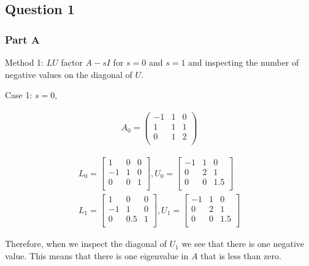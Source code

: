 \subsection{Question 1}
\subsubsection{Part A}

Method 1: \(LU\) factor \(A-sI\) for \(s=0\) and \(s=1\) and inspecting the number of negative values on the diagonal of \(U\).

Case 1: \(s=0\),

\begin{eqnarray}
  A_0 = 
  \begin{pmatrix}
    -1 & 1 & 0 \\
    1 & 1 & 1 \\
    0 & 1 & 2 \\
  \end{pmatrix}
\end{eqnarray}

\begin{eqnarray}
  L_0 =
  \begin{bmatrix}
    1 & 0 & 0 \\
    -1 & 1 & 0 \\
    0 & 0 & 1 \\
  \end{bmatrix}
  , U_0 =
  \begin{bmatrix}
    -1 & 1 & 0 \\
    0 & 2 & 1 \\
    0 & 0 & 1.5 \\
  \end{bmatrix}
  \\
  L_1 = 
  \begin{bmatrix}
    1 & 0 & 0 \\
    -1 & 1 & 0 \\
    0 & 0.5 & 1 \\
  \end{bmatrix}
  , U_1 = 
  \begin{bmatrix}
    -1 & 1 & 0 \\
    0 & 2 & 1 \\
    0 & 0 & 1.5 \\
  \end{bmatrix}
\end{eqnarray}

Therefore, when we inspect the diagonal of \(U_1\) we see that there is one negative value.
This means that there is one eigenvalue in \(A\) that is less than zero.

